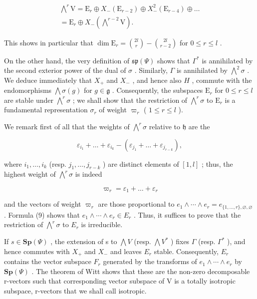 \[
\begin{array}{c} \bigwedge^ {r} \mathrm{V} = \mathrm{E} _ {r} \oplus X _ {-} (\mathrm{E} _ {r - 2}) \oplus X _ {-} ^ {2} (\mathrm{E} _ {r - 4}) \oplus \dots \\ = \mathrm{E} _ {r} \oplus X _ {-} (\bigwedge^ {r - 2} \mathrm{V}). \end{array}
\]

This shows in particular that \(\dim \mathrm{E}_r = \binom{2l}{r} - \binom{2l}{r-2}\) for \(0 \leq r \leq l\) .

On the other hand, the very definition of \(\mathfrak{sp}(\varPsi)\) shows that \(\Gamma^{*}\) is annihilated by the second exterior power of the dual of \(\sigma\) . Similarly, \(\Gamma\) is annihilated by \(\bigwedge^{2}\sigma\) . We deduce immediately that \(X_{+}\) and \(X_{-}\) , and hence also \(H\) , commute with the endomorphisms \(\bigwedge\sigma(g)\) for \(g\in\mathfrak{g}\) . Consequently, the subspaces \(\mathrm{E}_{r}\) for \(0\leq r\leq l\) are stable under \(\bigwedge^{r}\sigma\) ; we shall show that the restriction of \(\bigwedge^{r}\sigma\) to \(\mathrm{E}_{r}\) is a fundamental representation \(\sigma_{r}\) of weight \(\varpi_{r}\) ( \(1\leq r\leq l\) ).

We remark first of all that the weights of \(\bigwedge^{r}\sigma\) relative to \(\mathfrak{h}\) are the

\[
\varepsilon_ {i _ {1}} + \dots + \varepsilon_ {i _ {k}} - (\varepsilon_ {j _ {1}} + \dots + \varepsilon_ {j _ {r - k}}),
\]

where \(i_1, \ldots, i_k\) (resp. \(j_1, \ldots, j_{r-k}\) ) are distinct elements of \([1, l]\) ; thus, the highest weight of \(\bigwedge^r \sigma\) is indeed

\[
\varpi_ {r} = \varepsilon_ {1} + \dots + \varepsilon_ {r}
\]

and the vectors of weight \(\varpi_{r}\) are those proportional to \(e_{1} \wedge \cdots \wedge e_{r} = e_{\{1,\ldots,r\},\varnothing,\varnothing}\) . Formula (9) shows that \(e_{1} \wedge \cdots \wedge e_{r} \in E_{r}\) . Thus, it suffices to prove that the restriction of \(\bigwedge^{r}\sigma\) to \(E_{r}\) is irreducible.

If \(s \in \mathbf{Sp}(\varPsi)\) , the extension of s to \(\bigwedge V\) (resp. \(\bigwedge V^{*}\) ) fixes \(\varGamma\) (resp. \(\varGamma^{*}\) ), and hence commutes with \(X_{+}\) and \(X_{-}\) and leaves \(E_{r}\) stable. Consequently, \(E_{r}\) contains the vector subspace \(F_{r}\) generated by the transforms of \(e_{1} \wedge \cdots \wedge e_{r}\) by \(\mathbf{Sp}(\varPsi)\) . The theorem of Witt shows that these are the non-zero decomposable r-vectors such that corresponding vector subspace of V is a totally isotropic subspace, r-vectors that we shall call isotropic.

